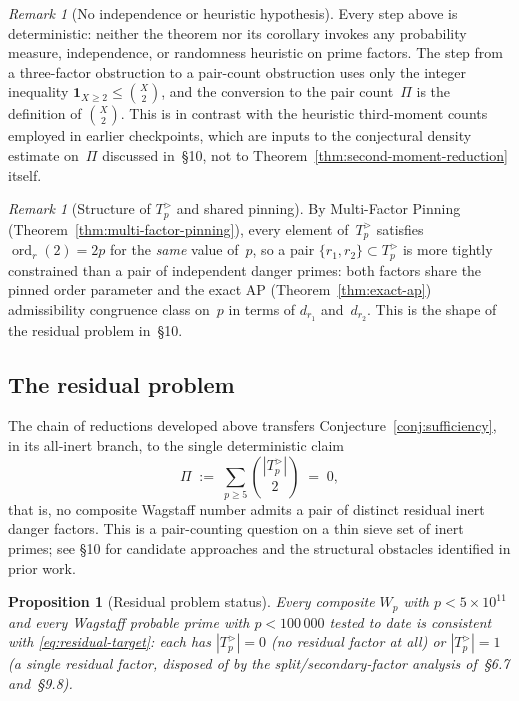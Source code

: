 \documentclass[12pt]{article}
\theoremstyle{plain}
\newtheorem{proposition}[theorem]{Proposition}
\theoremstyle{definition}
\theoremstyle{remark}
\newtheorem{remark}[theorem]{Remark}
\begin{document}
\begin{remark}[No independence or heuristic hypothesis]
Every step above is deterministic: neither the theorem nor its
corollary invokes any probability measure, independence, or
randomness heuristic on prime factors. The step from a
three-factor obstruction to a pair-count obstruction uses only the
integer inequality \(\mathbf{1}_{X\geq 2} \leq \binom{X}{2}\), and
the conversion to the pair count~\(\Pi\) is the definition of
\(\binom{X}{2}\). This is in contrast with the heuristic
third-moment counts employed in earlier checkpoints, which are
inputs to the conjectural density estimate on~\(\Pi\) discussed
in~\S10, not to Theorem~\ref{thm:second-moment-reduction} itself.
\end{remark}

\begin{remark}[Structure of \(T_p^{>}\) and shared pinning]
By Multi-Factor Pinning
(Theorem~\ref{thm:multi-factor-pinning}), every element of~\(T_p^{>}\)
satisfies \(\operatorname{ord}_r(2) = 2p\) for the \emph{same}
value of~\(p\), so a pair \(\{r_1, r_2\} \subset T_p^{>}\) is
more tightly constrained than a pair of independent danger primes:
both factors share the pinned order parameter and the exact AP
(Theorem~\ref{thm:exact-ap}) admissibility congruence class on~\(p\)
in terms of \(d_{r_1}\) and~\(d_{r_2}\). This is the shape of the
residual problem in~\S10.
\end{remark}

\subsection{The residual problem}

The chain of reductions developed above transfers
Conjecture~\ref{conj:sufficiency}, in its all-inert branch, to the
single deterministic claim
\begin{equation}\label{eq:residual-target}
  \Pi \;:=\; \sum_{p \geq 5} \binom{|T_p^{>}|}{2} \;=\; 0,
\end{equation}
that is, no composite Wagstaff number admits a pair of distinct
residual inert danger factors. This is a pair-counting question on
a thin sieve set of inert primes; see \S10 for candidate approaches
and the structural obstacles identified in prior work.

\begin{proposition}[Residual problem status]\label{prop:residual-status}
Every composite \(W_p\) with \(p < 5 \times 10^{11}\) and every
Wagstaff probable prime with \(p < 100\,000\) tested to date is
consistent with \eqref{eq:residual-target}: each has
\(|T_p^{>}| = 0\) (no residual factor at all) or
\(|T_p^{>}| = 1\) (a single residual factor, disposed of by the
split/secondary-factor analysis of~\S6.7 and~\S9.8).
\end{proposition}
\end{document}
